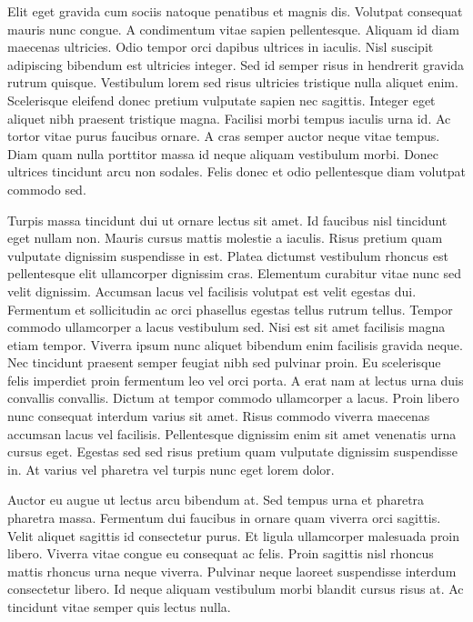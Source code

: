 \documentclass[11pt,a4paper,openright,twoside,onecolumn]{memoir}
\begin{document}
Elit eget gravida cum sociis natoque penatibus et magnis dis. Volutpat
consequat mauris nunc congue. A condimentum vitae sapien pellentesque.
Aliquam id diam maecenas ultricies. Odio tempor orci dapibus ultrices in
iaculis. Nisl suscipit adipiscing bibendum est ultricies integer. Sed id
semper risus in hendrerit gravida rutrum quisque. Vestibulum lorem sed
risus ultricies tristique nulla aliquet enim. Scelerisque eleifend donec
pretium vulputate sapien nec sagittis. Integer eget aliquet nibh
praesent tristique magna. Facilisi morbi tempus iaculis urna id. Ac
tortor vitae purus faucibus ornare. A cras semper auctor neque vitae
tempus. Diam quam nulla porttitor massa id neque aliquam vestibulum
morbi. Donec ultrices tincidunt arcu non sodales. Felis donec et odio
pellentesque diam volutpat commodo sed.

Turpis massa tincidunt dui ut ornare lectus sit amet. Id faucibus nisl
tincidunt eget nullam non. Mauris cursus mattis molestie a iaculis.
Risus pretium quam vulputate dignissim suspendisse in est. Platea
dictumst vestibulum rhoncus est pellentesque elit ullamcorper dignissim
cras. Elementum curabitur vitae nunc sed velit dignissim. Accumsan lacus
vel facilisis volutpat est velit egestas dui. Fermentum et sollicitudin
ac orci phasellus egestas tellus rutrum tellus. Tempor commodo
ullamcorper a lacus vestibulum sed. Nisi est sit amet facilisis magna
etiam tempor. Viverra ipsum nunc aliquet bibendum enim facilisis gravida
neque. Nec tincidunt praesent semper feugiat nibh sed pulvinar proin. Eu
scelerisque felis imperdiet proin fermentum leo vel orci porta. A erat
nam at lectus urna duis convallis convallis. Dictum at tempor commodo
ullamcorper a lacus. Proin libero nunc consequat interdum varius sit
amet. Risus commodo viverra maecenas accumsan lacus vel facilisis.
Pellentesque dignissim enim sit amet venenatis urna cursus eget. Egestas
sed sed risus pretium quam vulputate dignissim suspendisse in. At varius
vel pharetra vel turpis nunc eget lorem dolor.

Auctor eu augue ut lectus arcu bibendum at. Sed tempus urna et pharetra
pharetra massa. Fermentum dui faucibus in ornare quam viverra orci
sagittis. Velit aliquet sagittis id consectetur purus. Et ligula
ullamcorper malesuada proin libero. Viverra vitae congue eu consequat ac
felis. Proin sagittis nisl rhoncus mattis rhoncus urna neque viverra.
Pulvinar neque laoreet suspendisse interdum consectetur libero. Id neque
aliquam vestibulum morbi blandit cursus risus at. Ac tincidunt vitae
semper quis lectus nulla.
\end{document}

